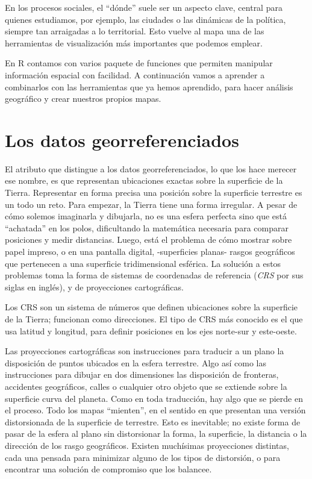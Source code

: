 \documentclass[]{book}
\begin{document}
En los procesos sociales, el ``dónde'' suele ser un aspecto clave,
central para quienes estudiamos, por ejemplo, las ciudades o las
dinámicas de la política, siempre tan arraigadas a lo territorial. Esto
vuelve al mapa una de las herramientas de visualización más importantes
que podemos emplear.

En R contamos con varios paquete de funciones que permiten manipular
información espacial con facilidad. A continuación vamos a aprender a
combinarlos con las herramientas que ya hemos aprendido, para hacer
análisis geográfico y crear nuestros propios mapas.

\section{Los datos georreferenciados}\label{los-datos-georreferenciados}

El atributo que distingue a los datos georreferenciados, lo que los hace
merecer ese nombre, es que representan ubicaciones exactas sobre la
superficie de la Tierra. Representar en forma precisa una posición sobre
la superficie terrestre es un todo un reto. Para empezar, la Tierra
tiene una forma irregular. A pesar de cómo solemos imaginarla y
dibujarla, no es una esfera perfecta sino que está ``achatada'' en los
polos, dificultando la matemática necesaria para comparar posiciones y
medir distancias. Luego, está el problema de cómo mostrar sobre papel
impreso, o en una pantalla digital, -superficies planas- rasgos
geográficos que pertenecen a una superficie tridimensional esférica. La
solución a estos problemas toma la forma de sistemas de coordenadas de
referencia (\emph{CRS} por sus siglas en inglés), y de proyecciones
cartográficas.

Los CRS son un sistema de números que definen ubicaciones sobre la
superficie de la Tierra; funcionan como direcciones. El tipo de CRS más
conocido es el que usa latitud y longitud, para definir posiciones en
los ejes norte-sur y este-oeste.

Las proyecciones cartográficas son instrucciones para traducir a un
plano la disposición de puntos ubicados en la esfera terrestre. Algo así
como las instrucciones para dibujar en dos dimensiones las disposición
de fronteras, accidentes geográficos, calles o cualquier otro objeto que
se extiende sobre la superficie curva del planeta. Como en toda
traducción, hay algo que se pierde en el proceso. Todo los mapas
``mienten'', en el sentido en que presentan una versión distorsionada de
la superficie de terrestre. Esto es inevitable; no existe forma de pasar
de la esfera al plano sin distorsionar la forma, la superficie, la
distancia o la dirección de los rasgo geográficos. Existen muchísimas
proyecciones distintas, cada una pensada para minimizar alguno de los
tipos de distorsión, o para encontrar una solución de compromiso que los
balancee.
\end{document}
